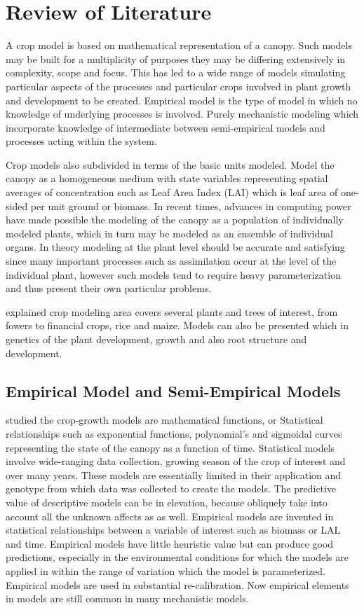 \section{Review of Literature}
A crop model is based on mathematical representation of a canopy. Such models may be built for a multiplicity of purposes they may be differing extensively in complexity, scope and focus. This has led to a wide range of models simulating particular aspects of the processes and particular crops involved in plant growth and development to be created. Empirical model is the type of model in which no knowledge of underlying processes is involved. Purely mechanistic modeling which incorporate knowledge of intermediate between semi-empirical models and processes acting within the system.

 Crop models also subdivided in terms of the basic units modeled. Model the canopy as a homogeneous medium with state variables representing spatial averages of concentration such as Leaf Area Index (LAI) which is leaf area of one-sided per unit ground or biomass. In recent times, advances in computing power have made possible the modeling of the canopy as a population of individually modeled plants, which in turn may be modeled as an ensemble of individual organs. In theory modeling at the plant level should be accurate and satisfying since many important processes such as assimilation occur at the level of the individual plant, however such models tend to require heavy parameterization and thus present their own particular problems.

 \citet{Fisher2000} explained crop modeling area covers several plants and trees of interest, from fowers to financial crops,  rice \citet{JameCutforth1996} and maize. Models can also be presented which in genetics of the plant development, growth and also root structure and development.


\subsection{Empirical Model and Semi-Empirical Models} 
 \citet{Marcelis1998} studied the crop-growth models are mathematical functions, or Statistical relationships such as exponential functions, polynomial's and sigmoidal curves representing the state of the canopy as a function of time. Statistical models involve wide-ranging data collection, growing season of the crop of interest and over many years. These models are essentially limited in their application and genotype from which data was collected to create the models. The predictive value of descriptive models can be in elevation, because obliquely take into account all the unknown affects as as well.  Empirical models are invented in statistical relationships between a variable of interest such as biomass or LAL and time. Empirical models have little heuristic value but can produce good predictions, especially in the environmental conditions for which the models are applied in within the range of variation which the model is parameterized. Empirical models are used in substantial re-calibration. Now empirical elements in models are still common in many mechanistic models.

